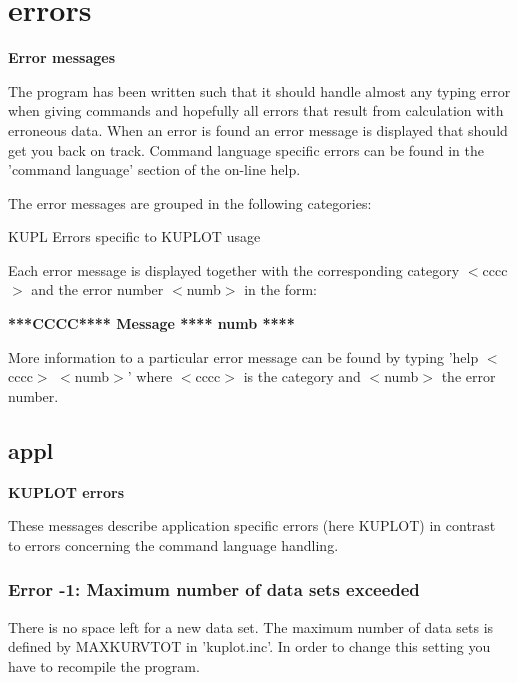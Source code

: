 \section{errors}
{\bf Error messages \par }
\par
\vspace{3pt}
The program has been written such that it should handle almost 
any typing error when giving commands and hopefully all errors 
that result from calculation with erroneous data. When an error 
is found an error message is displayed that should get you back 
on track. Command language specific errors can be found in the 
'command language' section of the on-line help. 
\par
The error messages are grouped in the following categories: 
\par
\begin{MacVerbatim}
KUPL   Errors specific to KUPLOT usage
\end{MacVerbatim}
Each error message is displayed together with the corresponding 
category $ <$cccc$> $ and the error number $ <$numb$> $ in the form: 
\par
{\bf   ****CCCC**** Message                    **** numb **** \par }
\par
\vspace{3pt}
More information to a particular error message can be found by 
typing 'help $ <$cccc$> $ $ <$numb$> $' where $ <$cccc$> $ is the category and 
$ <$numb$> $ the error number. 
\par
\subsection*{appl}
{\bf KUPLOT errors \par }
\par
\vspace{3pt}
These messages describe application specific errors (here KUPLOT) 
in contrast to errors concerning the command language handling. 
\par
\subsubsection{Error -1: Maximum number of data sets exceeded}
\par
There is no space left for a new data set. The maximum number of 
data sets is defined by MAXKURVTOT in 'kuplot.inc'. In order to 
change this setting you have to recompile the program. 
